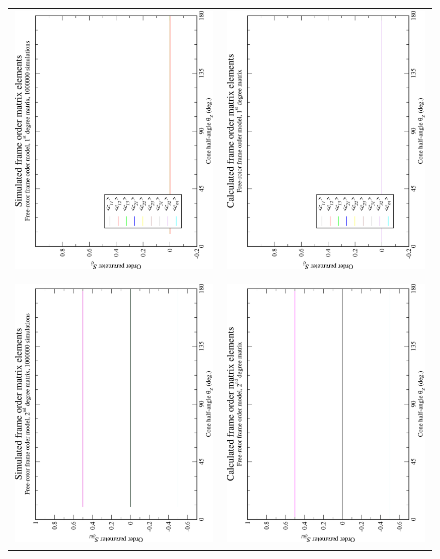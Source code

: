 \begin{figure}
\centering
  \begin{tabular}{@{}cc@{}}
    \includegraphics[width=.35\textwidth,angle=270]{images/frame_order_matrix/Sij_free_rotor_in_frame_theta_z_ens1000000.eps} &
    \includegraphics[width=.35\textwidth,angle=270]{images/frame_order_matrix/Sij_free_rotor_in_frame_theta_z_calc.eps} \\
    \\[-5pt]
    \includegraphics[width=.35\textwidth,angle=270]{images/frame_order_matrix/Sijkl_free_rotor_in_frame_theta_z_ens1000000.eps} &
    \includegraphics[width=.35\textwidth,angle=270]{images/frame_order_matrix/Sijkl_free_rotor_in_frame_theta_z_calc.eps} \\

\end{tabular}
\end{figure}
